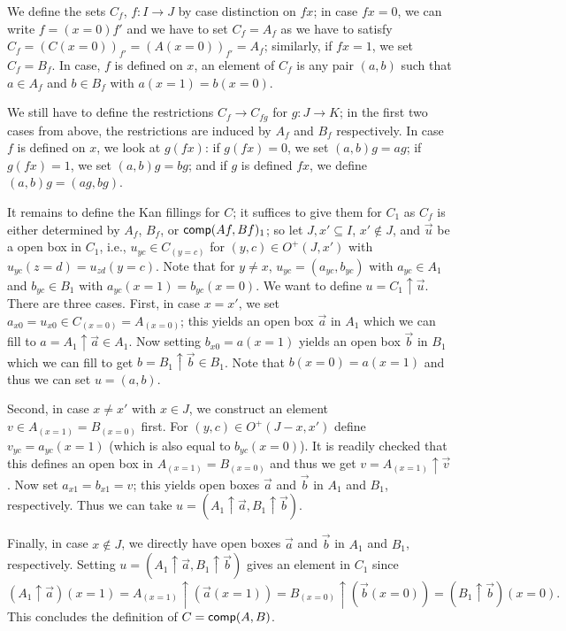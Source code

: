 \documentclass[10pt,a4paper]{article}
\newcommand{\comp}{{\sf comp}}
\newcommand{\rup}[1]{#1{\uparrow}}
\newcommand{\OO}{O}
\begin{document}
We define the sets $C_f$, $f \colon I \to J$ by case distinction on $f
x$; in case $f x = 0$, we can write $f = (x=0) f'$ and we have to set
$C_f = A_f$ as we have to satisfy $C_f = (C(x=0))_{f'} = (A
(x=0))_{f'} = A_f$; similarly, if $f x = 1$, we set $C_f = B_f$.  In
case, $f$ is defined on $x$, an element of $C_f$ is any pair $(a,b)$
such that $a \in A_f$ and $b \in B_f$ with $a (x=1) = b (x=0)$.

We still have to define the restrictions $C_f \to C_{fg}$ for $g
\colon J \to K$; in the first two cases from above, the restrictions
are induced by $A_f$ and $B_f$ respectively.  In case $f$ is defined
on $x$, we look at $g(f x)$: if $g (f x)= 0$, we set $(a,b) g = ag$; if
$g (f x) = 1$, we set $(a,b)g = bg$; and if $g$ is defined $f x$, we
define $(a,b)g = (ag,bg)$.

It remains to define the Kan fillings for $C$; it suffices to give
them for $C_1$ as $C_f$ is either determined by $A_f$, $B_f$, or
$\comp (Af,Bf)_1$; so let $J, x' \subseteq I$, $x' \notin J$, and
$\vec u$ be a open box in $C_1$, i.e., $u_{yc} \in C_{(y=c)}$ for
$(y,c) \in \OO^+ (J,x')$ with $u_{yc} (z=d) = u_{zd} (y=c)$.  Note
that for $y \neq x$, $u_{yc}= (a_{yc}, b_{yc})$ with $a_{yc} \in A_1$
and $b_{yc} \in B_1$ with $a_{yc} (x=1) = b_{yc} (x=0)$.  We want to
define $u = \rup{C_1}\vec u$.  There are three cases.  First, in case
$x = x'$, we set $a_{x0} = u_{x0} \in C_{(x=0)} = A_{(x=0)}$; this
yields an open box $\vec a$ in $A_1$ which we can fill to $a =
\rup{A_1} \vec a \in A_1$.  Now setting $b_{x0} = a (x=1)$ yields an
open box $\vec b$ in $B_1$ which we can fill to get $b = \rup{B_1}
\vec b \in B_1$. Note that $b(x=0) = a (x=1)$ and thus we can set $u =
(a, b)$.

Second, in case $x \neq x'$ with $x \in J$, we construct an element $v
\in A_{(x=1)} = B_{(x=0)}$ first.  For $(y,c) \in \OO^+ (J-x, x')$
define $v_{yc} = a_{yc} (x=1)$ (which is also equal to $b_{yc}
(x=0)$).  It is readily checked that this defines an open box in
$A_{(x=1)} = B_{(x=0)}$ and thus we get $v = \rup{A_{(x=1)}} \vec v$.
Now set $a_{x1} = b_{x1} = v$; this yields open boxes $\vec a$ and
$\vec b$ in $A_1$ and $B_1$, respectively.  Thus we can take $u =
(\rup{A_1} \vec a,\rup{B_1} \vec b)$.

Finally, in case $x \notin J$, we directly have open boxes $\vec a$
and $\vec b$ in $A_1$ and $B_1$, respectively. Setting $u = (\rup{A_1}
\vec a,\rup{B_1} \vec b)$ gives an element in $C_1$ since
\[
(\rup{A_1} \vec a) (x=1) = \rup{A_{(x=1)}} (\vec a (x=1)) = \rup
{B_{(x=0)}} (\vec b (x=0)) = (\rup{B_1} \vec b) (x=0).
\]
This concludes the definition of $C=\comp(A,B)$.
\end{document}
